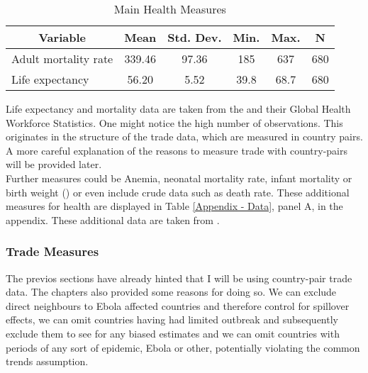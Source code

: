 \documentclass{article}
\begin{document}
\begin{table}[htbp]\centering \caption{Main Health Measures \label{Main Health Measures}}
\begin{tabular}{l c c c c c}\hline\hline
\multicolumn{1}{c}{\textbf{Variable}} & \textbf{Mean}
 & \textbf{Std. Dev.}& \textbf{Min.} &  \textbf{Max.} & \textbf{N}\\ \hline
Adult mortality rate & 339.46 & 97.36 & 185 & 637 & 680\\
Life expectancy & 56.20 & 5.52 & 39.8 & 68.7 & 680 \\
\hline\end{tabular}
\end{table}

Life expectancy and mortality data are taken from the \cite{whostatistics} and their Global Health Workforce Statistics. One might notice the high number of observations. This originates in the structure of the trade data, which are measured in country pairs. A more careful explanation of the reasons to measure trade with country-pairs will be provided later. \\
Further measures could be Anemia, neonatal mortality rate, infant mortality or birth weight (\cite{weil2014health}) or even include crude data such as death rate. These additional measures for health are displayed in Table \ref{Appendix - Data}, panel A, in the appendix. These additional data are taken from \cite{wdi}.

\subsubsection{Trade Measures}

The previos sections have already hinted that I will be using country-pair trade data. The chapters also provided some reasons for doing so. We can exclude direct neighbours to Ebola affected countries and therefore control for spillover effects, we can omit countries having had limited outbreak and subsequently exclude them to see for any biased estimates and we can omit countries with periods of any sort of epidemic, Ebola or other, potentially violating the common trends assumption. \\
\end{document}
